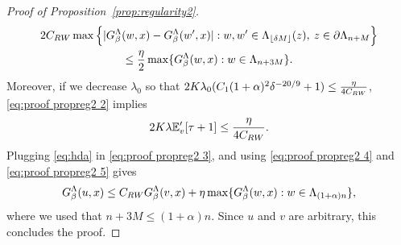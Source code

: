 \documentclass[11pt,a4paper]{article}
\numberwithin{equation}{section}
\theoremstyle{plain}
\theoremstyle{definition}
\begin{document}
\begin{proof}[Proof of Proposition~\textup{\ref{prop:regularity2}}]
\begin{multline}\label{eq:proof propreg2 4}
	2C_{\rm RW}\max \Big\{|G_\beta^\Lambda(w,x)-G_\beta^{\Lambda}(w',x)|: w,w'\in \Lambda_{\lfloor \delta M\rfloor}(z), \: z\in \partial \Lambda_{n+M}\Big\}\\\leq \frac{\eta}{2}\max\{G_\beta^{\Lambda}(w,x): w \in \Lambda_{n+3M}\}.
\end{multline}
Moreover, if we decrease $\lambda_0$ so that $2K\lambda_0 (C_1(1+\alpha)^2\delta^{-20/9}+1)\leq \tfrac{\eta}{4C_{\rm RW}}$, \eqref{eq:proof propreg2 2} implies 
\begin{equation}\label{eq:proof propreg2 5}
	2K\lambda \mathbb E_v'[\tau+1]\leq \frac{\eta}{4 C_{\rm RW}}.
\end{equation}
Plugging \eqref{eq:hda} in \eqref{eq:proof propreg2 3}, and using \eqref{eq:proof propreg2 4} and \eqref{eq:proof propreg2 5} gives
\begin{equation}
	G_\beta^{\Lambda}(u,x)\leq C_{\rm RW}G_\beta^{\Lambda}(v,x)+\eta\max\{G_\beta^\Lambda(w,x):w\in \Lambda_{(1+\alpha)n}\},
\end{equation}
where we used that $n+3M\leq (1+\alpha)n$. Since $u$ and $v$ are arbitrary, this concludes the proof.

\end{proof}
\end{document}

